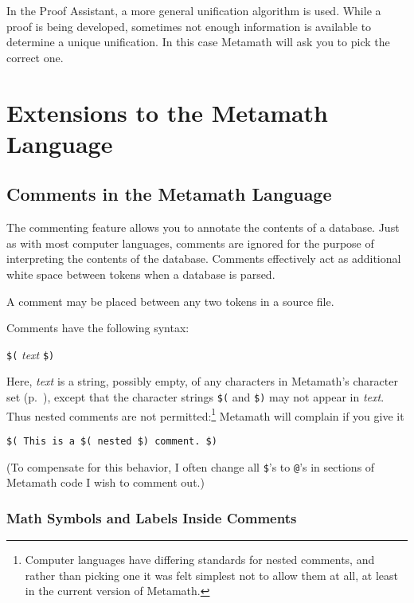 In the Proof Assistant, a more general unification
algorithm is used.  While a proof is being developed, sometimes not enough
information is available to determine a unique unification.  In this case
Metamath will ask you to pick the correct one.

\section{Extensions to the Metamath Language}

\subsection{Comments in the Metamath Language}\label{comments}

The commenting feature allows you to annotate the contents of
a database.  Just as with most
computer languages, comments are ignored for the purpose of interpreting the
contents of the database. Comments effectively act as
additional white space between tokens
when a database is parsed.

A comment may be placed between any two tokens in a source
file.

Comments have the following syntax:
\begin{center}
 \texttt{\$(} {\em text} \texttt{\$)}
\end{center}
Here, {\em text} is a string, possibly empty, of any
characters in Metamath's character set (p.~\pageref{spec1chars}), except
that the character strings \texttt{\$(} and \texttt{\$)} may not appear
in {\em text}.  Thus nested comments are not
permitted:\footnote{Computer languages have differing standards for
nested comments, and rather than picking one it was felt simplest not to
allow them at all, at least in the current version of
Metamath.} Metamath will
complain if you give it
\begin{center}
 \texttt{\$( This is a \$( nested \$) comment.\ \$)}
\end{center}
(To compensate for this behavior, I often change all \texttt{\$}'s to
\texttt{@}'s in sections of Metamath code I wish to comment out.)

\subsubsection{Math Symbols and Labels Inside Comments}
\label{mathcomments}

